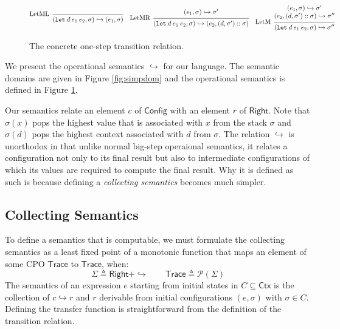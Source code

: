 \documentclass[acmsmall,screen,review]{acmart}\settopmatter{printfolios=true,printccs=false,printacmref=false}
\newcommand*{\cons}{::}
\newcommand*{\pset}{\mathcal{P}}
\newcommand*{\modid}{d}
\newcommand*{\ctx}{\sigma}
\newcommand*{\Ctx}{\mathsf{Ctx}}
\newcommand*{\Trace}{\mathsf{Trace}}
\newcommand*{\Config}{\mathsf{Config}}
\newcommand*{\config}{c}
\newcommand*{\Right}{\mathsf{Right}}
\newcommand*{\rightst}{r}
\newcommand*{\semarrow}{\hookrightarrow}
\begin{document}
\begin{figure}[t!]
  \[
    \begin{prooftree}
      \infer[left label=LetML]0{
      (\mathtt{let}\:\modid\:e_{1}\:e_{2}, \ctx)
      \semarrow
      (e_{1}, \ctx)
      }
    \end{prooftree}\quad
    \begin{prooftree}
      \hypo{
        \begin{matrix}
          (e_{1}, \ctx)
          \semarrow
          \ctx'
        \end{matrix}
      }
      \infer[left label=LetMR]1{
      (\mathtt{let}\:\modid\:e_{1}\:e_{2}, \ctx)
      \semarrow
      (e_{2}, (\modid, \ctx')\cons \ctx)
      }
    \end{prooftree}\quad
    \begin{prooftree}
      \hypo{
        \begin{matrix}
          (e_{1}, \ctx)
          \semarrow
          \ctx' \\
          (e_{2}, (\modid, \ctx')\cons \ctx)
          \semarrow
          \ctx''
        \end{matrix}
      }
      \infer[left label=LetM]1{
      (\mathtt{let}\:\modid\:e_{1}\:e_{2}, \ctx)
      \semarrow
      \ctx''
      }
    \end{prooftree}
  \]
  \caption{The concrete one-step transition relation.}
  \label{fig:simpreach}
\end{figure}
We present the operational semantics $\semarrow$ for our language.
The semantic domains are given in Figure \ref{fig:simpdom} and the operational semantics is defined in Figure \ref{fig:simpreach}.

Our semantics relate an element $\config$ of $\Config$ with an element $\rightst$ of $\Right$.
Note that $\ctx(x)$ pops the highest value that is associated with $x$ from the stack $\ctx$ and $\ctx(\modid)$ pops the highest context associated with $\modid$ from $\ctx$.
The relation $\semarrow$ is unorthodox in that unlike normal big-step operaional semantics, it relates a configuration not only to its final result but also to intermediate configurations of which its values are required to compute the final result.
Why it is defined as such is because defining a \emph{collecting semantics} becomes much simpler.

\subsection{Collecting Semantics}
To define a semantics that is computable, we must formulate the collecting semantics as a least fixed point of a monotonic function that maps an element of some CPO $\Trace$ to $\Trace$, when:
\[\Sigma\triangleq\Right+\semarrow\qquad\Trace\triangleq\pset(\Sigma)\]
The semantics of an expression $e$ starting from initial states in $C\subseteq\Ctx$ is the collection of $\config\semarrow\rightst$ and $\rightst$ derivable from initial configurations $(e,\ctx)$ with $\ctx\in C$.
Defining the transfer function is straightforward from the definition of the transition relation.
\end{document}
